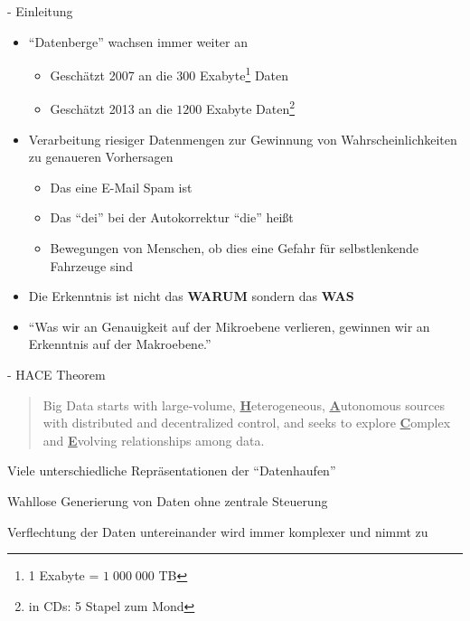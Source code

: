 \documentclass[fleqn,11pt,aspectratio=43]{beamer}
\begin{document}
\begin{frame}{\insertsectionhead - Einleitung \cite{mayer2014big} \cite{wu2014data}}
\begin{itemize}
\item \enquote{Datenberge} wachsen immer weiter an
\begin{itemize}
\item Geschätzt 2007 an die $300$ Exabyte\footnote{1 Exabyte = $1\;000\;000$ TB} Daten 
\item Geschätzt 2013 an die $1200$ Exabyte Daten\footnote{in CDs: 5 Stapel zum Mond}
\end{itemize}
\item Verarbeitung riesiger Datenmengen zur Gewinnung von Wahrscheinlichkeiten
zu genaueren Vorhersagen
\begin{itemize}
\item Das eine E-Mail Spam ist
\item Das \enquote{dei} bei der Autokorrektur \enquote{die} heißt
\item Bewegungen von Menschen, ob dies eine Gefahr für selbstlenkende Fahrzeuge sind
\end{itemize}
\item Die Erkenntnis ist nicht das \textbf{WARUM} sondern das \textbf{WAS} 
\item \enquote{Was wir an
Genauigkeit auf der Mikroebene verlieren, gewinnen wir an Erkenntnis
auf der Makroebene.} \cite{mayer2014big}
\end{itemize}
\end{frame}

\begin{frame}{\insertsectionhead - HACE Theorem \cite{wu2014data}}
\begin{quote}
Big Data starts with large-volume, \underline{\textbf{H}}eterogeneous, 
\underline{\textbf{A}}utonomous sources with distributed and decentralized control, 
and seeks to explore \underline{\textbf{C}}omplex and \underline{\textbf{E}}volving relationships 
among data.
\end{quote} %
\begin{description}\setlength{\itemsep}{15pt}
\item[{\parbox[t]{4cm}{Huge Heterogeneous Data:}}] {\parbox[t]{6.3cm}{Viele unterschiedliche Repräsentationen der \enquote{Datenhaufen}}}
\item[{\parbox[t]{4cm}{Autonomous Sources:}}] {\parbox[t]{6.3cm}{Wahllose Generierung von Daten ohne zentrale Steuerung}}
\item[{\parbox[t]{4cm}{Complex and Evolving Relationships:}}] {\parbox[t]{6.3cm}{Verflechtung der Daten untereinander wird immer komplexer und nimmt zu}}
\end{description}
\end{frame}
\end{document}
